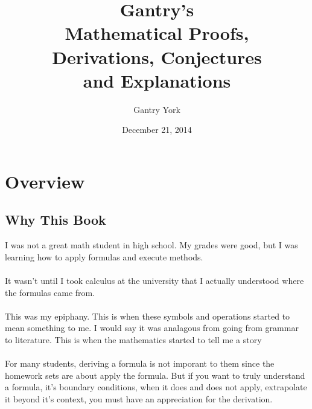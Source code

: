 \documentclass[11pt]{book}
\title{\textbf{Gantry's\\Mathematical Proofs,\\Derivations, Conjectures\\and Explanations}}
\author{Gantry York}
\date{December 21, 2014}
\begin{document}
\maketitle

\tableofcontents 


\chapter*{Overview}

\section*{Why This Book}
I was not a great math student in high school.  My grades were good, but I was learning how to apply formulas and execute methods.\\
\\
It wasn't until I took calculus at the university that I actually understood where the formulas came from.\\
\\
This was my epiphany.  This is when these symbols and operations started to mean something to me.  I would say it was analagous from going from grammar to literature.  This is when the mathematics started to tell me a story\\
\\
For many students, deriving a formula is not imporant to them since the homework sets are about apply the formula.  But if you want to truly understand a formula, it's boundary conditions, when it does and does not apply, extrapolate it beyond it's context, you must have an appreciation for the derivation.\\
\\
\end{document}

